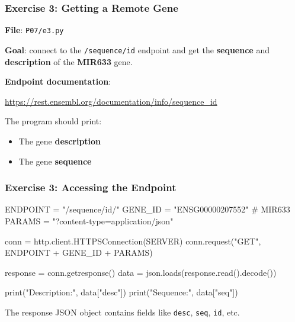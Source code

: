 \documentclass[xcolor=table]{beamer}
\begin{document}
\begin{frame}
\frametitle{Exercise 3: Getting a Remote Gene}

\textbf{File}: \texttt{P07/e3.py}

\vspace{0.3cm}

\textbf{Goal}: connect to the \texttt{/sequence/id} endpoint and get the \textbf{sequence} and \textbf{description} of the \textbf{MIR633} gene.

\vspace{0.3cm}

\textbf{Endpoint documentation}:
\begin{center}
\small\url{https://rest.ensembl.org/documentation/info/sequence_id}
\end{center}

\vspace{0.3cm}

The program should print:
\begin{itemize}
\item The gene \textbf{description}
\item The gene \textbf{sequence}
\end{itemize}

\end{frame}

\begin{frame}[fragile]
\frametitle{Exercise 3: Accessing the Endpoint}

\begin{python}
ENDPOINT = "/sequence/id/"
GENE_ID = "ENSG00000207552"  # MIR633
PARAMS = "?content-type=application/json"

conn = http.client.HTTPSConnection(SERVER)
conn.request("GET",
    ENDPOINT + GENE_ID + PARAMS)

response = conn.getresponse()
data = json.loads(response.read().decode())

print("Description:", data["desc"])
print("Sequence:", data["seq"])
\end{python}

\vspace{0.2cm}

The response JSON object contains fields like \texttt{desc}, \texttt{seq}, \texttt{id}, etc.

\end{frame}

\end{document}
